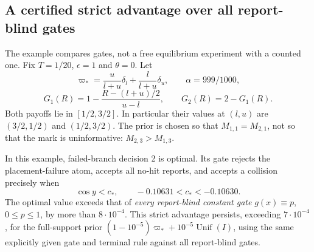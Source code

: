 \subsection{A certified strict advantage over all report-blind gates}
The example compares gates, not a free equilibrium experiment with a counted one. Fix $T=1/20$, $\epsilon=1$ and $\theta=0$. Let
\[
 \varpi_* =\frac{u}{l+u}\delta_l+\frac{l}{l+u}\delta_u,
 \qquad \alpha=999/1000,
\]
\[
 G_1(R)=1-\frac{R-(l+u)/2}{u-l},\qquad G_2(R)=2-G_1(R).
\]
Both payoffs lie in $[1/2,3/2]$. In particular their values at $(l,u)$ are $(3/2,1/2)$ and $(1/2,3/2)$. The prior is chosen so that $M_{1,1}=M_{2,1}$, not so that the mark is uninformative: $M_{2,3}>M_{1,3}$.

\begin{proposition}\label{prop:example}
In this example, failed-branch decision 2 is optimal. Its gate rejects the placement-failure atom, accepts all no-hit reports, and accepts a collision precisely when
\[
 \cos y<c_*,\qquad -0.10631<c_*<-0.10630.
\]
The optimal value exceeds that of \emph{every report-blind constant gate} $g(x)\equiv p$, $0\le p\le1$, by more than $8\cdot10^{-4}$. This strict advantage persists, exceeding $7\cdot10^{-4}$, for the full-support prior $(1-10^{-5})\varpi_*+10^{-5}\operatorname{Unif}(I)$, using the same explicitly given gate and terminal rule against all report-blind gates.
\end{proposition}

